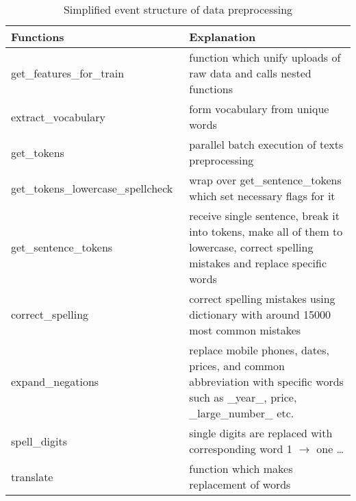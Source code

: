\begin{table}[h]
	\centering
	\caption{Simplified event structure of data preprocessing}
	\label{my-label}
	\begin{tabular}{| p{7cm} | p{10cm} |}
		\hline
		\textbf{Functions}                                    & \textbf{Explanation}                                                                                                                \\ \hline
		get\_features\_for\_train                             & function which unify uploads of raw data and calls nested functions                                                                   \\ \hline
		extract\_vocabulary                                   & form vocabulary from unique words                                                                                                   \\ \hline
		get\_tokens                                           & parallel batch execution of texts preprocessing 
		\\ \hline
		get\_tokens\_lowercase\_spellcheck\ & wrap over get\_sentence\_tokens which set necessary flags for it                                                                    \\ \hline
		get\_sentence\_tokens                                 & receive single sentence, break it into tokens, make all of them to lowercase, correct spelling mistakes and replace specific words \\ \hline
		correct\_spelling                                     & correct spelling mistakes using dictionary with around 15000 most common mistakes                                                   \\ \hline
		expand\_negations                                     & replace mobile phones, dates, prices, and common abbreviation with specific words such as \_year\_, price,  \_large\_number\_ etc.  \\ \hline
		spell\_digits                                         & single digits are replaced with corresponding word 1 $\rightarrow$ one …                                                                          \\ \hline
		translate                                             & function which makes replacement of words                                                                                           \\ \hline
	\end{tabular}
\end{table}



